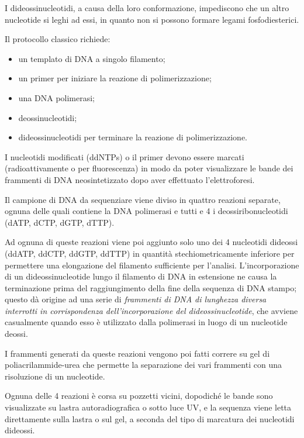 \documentclass[]{article}
\begin{document}
I dideossinucleotidi, a causa della loro conformazione, impediscono che
un altro nucleotide si leghi ad essi, in quanto non si possono formare
legami fosfodiesterici.

Il protocollo classico richiede:

\begin{itemize}
\itemsep1pt\parskip0pt
\item
  un templato di DNA a singolo filamento;
\item
  un primer per iniziare la reazione di polimerizzazione;
\item
  una DNA polimerasi;
\item
  deossinucleotidi;
\item
  dideossinucleotidi per terminare la reazione di polimerizzazione.
\end{itemize}

I nucleotidi modificati (ddNTPs) o il primer devono essere marcati
(radioattivamente o per fluorescenza) in modo da poter visualizzare le
bande dei frammenti di DNA neosintetizzato dopo aver effettuato
l'elettroforesi.

Il campione di DNA da sequenziare viene diviso in quattro reazioni
separate, ognuna delle quali contiene la DNA polimerasi e tutti e 4 i
deossiribonucleotidi (dATP, dCTP, dGTP, dTTP).

Ad ognuna di queste reazioni viene poi aggiunto solo uno dei 4
nucleotidi dideossi (ddATP, ddCTP, ddGTP, ddTTP) in quantità
stechiometricamente inferiore per permettere una elongazione del
filamento sufficiente per l'analisi. L'incorporazione di un
dideossinucleotide lungo il filamento di DNA in estensione ne causa la
terminazione prima del raggiungimento della fine della sequenza di DNA
stampo; questo dà origine ad una serie di \emph{frammenti di DNA di
lunghezza diversa interrotti in corrispondenza dell'incorporazione del
dideossinucleotide}, che avviene casualmente quando esso è utilizzato
dalla polimerasi in luogo di un nucleotide deossi.

I frammenti generati da queste reazioni vengono poi fatti correre su gel
di poliacrilammide-urea che permette la separazione dei vari frammenti
con una risoluzione di un nucleotide.

Ognuna delle 4 reazioni è corsa su pozzetti vicini, dopodiché le bande
sono visualizzate su lastra autoradiografica o sotto luce UV, e la
sequenza viene letta direttamente sulla lastra o sul gel, a seconda del
tipo di marcatura dei nucleotidi dideossi.
\end{document}
